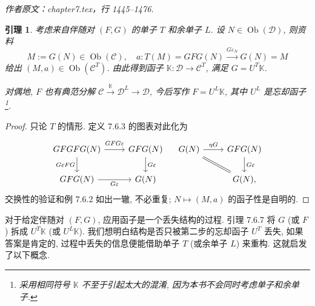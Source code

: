 \documentclass[11pt]{article}
\newcommand{\Obj}{\operatorname{Ob}}
\newcommand{\CorpusNumber}{0}
\newtheorem{lemma}[theorem]{引理}
\theoremstyle{definition}
\begin{document}
\par\medskip\noindent\textit{作者原文：chapter7.tex，行 1445--1476.}\par
\def\CorpusNumber{7.6.7}
\begin{lemma}\label{prop:T-comparison}
	考虑来自伴随对 $(F, G)$ 的单子 $T$ 和余单子 $L$. 设 $N \in \Obj(\mathcal{D})$, 则资料
	\[ M := G(N) \in \Obj(\mathcal{C}), \quad a: T(M) = GFG(N) \xrightarrow{G\varepsilon_N} G(N) = M \]
	给出 $(M, a) \in \Obj(\mathcal{C}^T)$. 由此得到函子 $\mathbb{K}: \mathcal{D} \to \mathcal{C}^T$, 满足 $G = U^T \mathbb{K}$.
	
	对偶地, $F$ 也有典范分解 $\mathcal{C} \xrightarrow{\mathbb{K}} \mathcal{D}^L \to \mathcal{D}$, 今后写作 $F = U^L \mathbb{K}$, 其中 $U^L$ 是忘却函子\footnote{采用相同符号 $\mathbb{K}$ 不至于引起太大的混淆, 因为本书不会同时考虑单子和余单子.}.
\end{lemma}
\begin{proof}
	只论 $T$ 的情形. 定义 7.6.3 的图表对此化为
	\[\begin{tikzcd}
		GFGFG(N) \arrow[r, "GFG\varepsilon" inner sep=0.5em] \arrow[d, "{G\varepsilon FG}"'] & GFG(N) \arrow[d, "G\varepsilon"] \\
		GFG(N) \arrow[r, "G\varepsilon"'] & G(N)
	\end{tikzcd} \quad \begin{tikzcd}
		G(N) \arrow[r, "\eta G"] \arrow[equal, rd] & GFG(N) \arrow[d, "{G\varepsilon}"] \\
		& G(N),
	\end{tikzcd} \]
	交换性的验证和例 7.6.2 如出一辙, 不必重复; $N \mapsto (M, a)$ 的函子性是自明的.
\end{proof}

对于给定伴随对 $(F, G)$, 应用函子是一个丢失结构的过程. 引理 7.6.7 将 $G$ (或 $F$) 拆成 $U^T \mathbb{K}$ (或 $U^L \mathbb{K}$). 我们想明白结构是否只被第二步的忘却函子 $U^T$ 丢失, 如果答案是肯定的, 过程中丢失的信息便能借助单子 $T$ (或余单子 $L$) 来重构. 这就启发了以下概念.
\end{document}
